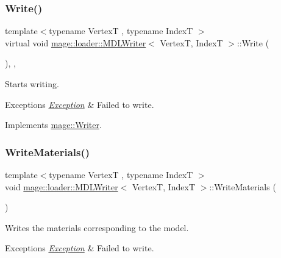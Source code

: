 \subsubsection{\texorpdfstring{Write()}{Write()}}
{\footnotesize\ttfamily template$<$typename VertexT , typename IndexT $>$ \\
virtual void \hyperlink{classmage_1_1loader_1_1_m_d_l_writer}{mage\+::loader\+::\+M\+D\+L\+Writer}$<$ VertexT, IndexT $>$\+::Write (\begin{DoxyParamCaption}{ }\end{DoxyParamCaption})\hspace{0.3cm}{\ttfamily [override]}, {\ttfamily [private]}, {\ttfamily [virtual]}}

Starts writing.


\begin{DoxyExceptions}{Exceptions}
{\em \hyperlink{classmage_1_1_exception}{Exception}} & Failed to write. \\
\hline
\end{DoxyExceptions}


Implements \hyperlink{classmage_1_1_writer_a9baf695ef7f6180bef883f60bcb3ac07}{mage\+::\+Writer}.

\hypertarget{classmage_1_1loader_1_1_m_d_l_writer_a695190923a4bf8158f2eae1c945fd052}{}\label{classmage_1_1loader_1_1_m_d_l_writer_a695190923a4bf8158f2eae1c945fd052} 
\subsubsection{\texorpdfstring{Write\+Materials()}{WriteMaterials()}}
{\footnotesize\ttfamily template$<$typename VertexT , typename IndexT $>$ \\
void \hyperlink{classmage_1_1loader_1_1_m_d_l_writer}{mage\+::loader\+::\+M\+D\+L\+Writer}$<$ VertexT, IndexT $>$\+::Write\+Materials (\begin{DoxyParamCaption}{ }\end{DoxyParamCaption})\hspace{0.3cm}{\ttfamily [private]}}

Writes the materials corresponding to the model.


\begin{DoxyExceptions}{Exceptions}
{\em \hyperlink{classmage_1_1_exception}{Exception}} & Failed to write. \\
\hline
\end{DoxyExceptions}
\hypertarget{classmage_1_1loader_1_1_m_d_l_writer_aff9e417a04491202090105b93e7ee42c}{}\label{classmage_1_1loader_1_1_m_d_l_writer_aff9e417a04491202090105b93e7ee42c} 

